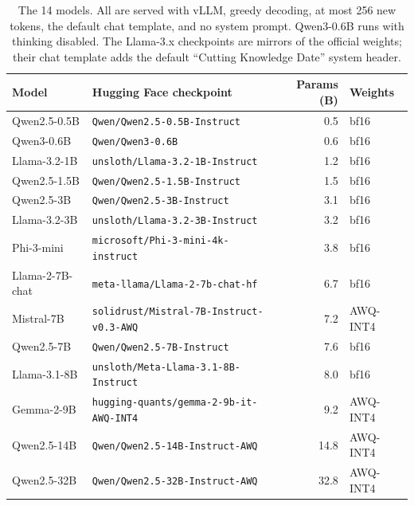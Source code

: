 \begin{table}[H]
\centering
\caption{The 14 models. All are served with vLLM, greedy decoding, at most 256 new tokens, the default chat template, and no system prompt. Qwen3-0.6B runs with thinking disabled. The Llama-3.x checkpoints are mirrors of the official weights; their chat template adds the default ``Cutting Knowledge Date'' system header.}
\label{tab:models}
\small
\begin{tabular}{@{}llrl@{}}
\toprule
Model & Hugging Face checkpoint & Params (B) & Weights \\
\midrule
Qwen2.5-0.5B & \texttt{Qwen/Qwen2.5-0.5B-Instruct} & 0.5 & bf16 \\
Qwen3-0.6B & \texttt{Qwen/Qwen3-0.6B} & 0.6 & bf16 \\
Llama-3.2-1B & \texttt{unsloth/Llama-3.2-1B-Instruct} & 1.2 & bf16 \\
Qwen2.5-1.5B & \texttt{Qwen/Qwen2.5-1.5B-Instruct} & 1.5 & bf16 \\
Qwen2.5-3B & \texttt{Qwen/Qwen2.5-3B-Instruct} & 3.1 & bf16 \\
Llama-3.2-3B & \texttt{unsloth/Llama-3.2-3B-Instruct} & 3.2 & bf16 \\
Phi-3-mini & \texttt{microsoft/Phi-3-mini-4k-instruct} & 3.8 & bf16 \\
Llama-2-7B-chat & \texttt{meta-llama/Llama-2-7b-chat-hf} & 6.7 & bf16 \\
Mistral-7B & \texttt{solidrust/Mistral-7B-Instruct-v0.3-AWQ} & 7.2 & AWQ-INT4 \\
Qwen2.5-7B & \texttt{Qwen/Qwen2.5-7B-Instruct} & 7.6 & bf16 \\
Llama-3.1-8B & \texttt{unsloth/Meta-Llama-3.1-8B-Instruct} & 8.0 & bf16 \\
Gemma-2-9B & \texttt{hugging-quants/gemma-2-9b-it-AWQ-INT4} & 9.2 & AWQ-INT4 \\
Qwen2.5-14B & \texttt{Qwen/Qwen2.5-14B-Instruct-AWQ} & 14.8 & AWQ-INT4 \\
Qwen2.5-32B & \texttt{Qwen/Qwen2.5-32B-Instruct-AWQ} & 32.8 & AWQ-INT4 \\
\bottomrule
\end{tabular}
\end{table}
